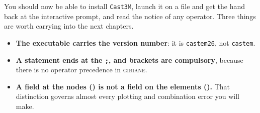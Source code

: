 
You should now be able to install \texttt{Cast3M}, launch it on a file and
get the hand back at the interactive prompt, and read the notice of any
operator. Three things are worth carrying into the next chapters.

\begin{gbox*}
\begin{itemize}
  \item \textbf{The executable carries the version number}: it is
  \texttt{castem26}, not \texttt{castem}.
  \item \textbf{A statement ends at the \texttt{;}, and brackets are
  compulsory}, because there is no operator precedence in
  \textsc{gibiane}.
  \item \textbf{A field at the nodes () is not a field on the
  elements ().} That distinction governs almost every plotting
  and combination error you will make.
\end{itemize}
\end{gbox*}

